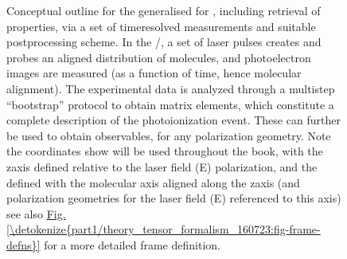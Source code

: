 \documentclass[letterpaper,table,10pt,english]{jupyterBook}
\begin{document}
\begin{figure}[htbp]
\centering
\capstart

\noindent{}
\caption{Conceptual outline for the generalised {\hyperref[\detokenize{backmatter/glossary:term-bootstrap-retrieval-protocol}]{}} for {\hyperref[\detokenize{backmatter/glossary:term-radial-matrix-elements}]{}}, including retrieval of {\hyperref[\detokenize{backmatter/glossary:term-MF}]{}} properties, via a set of time\sphinxhyphen{}resolved measurements and suitable post\sphinxhyphen{}processing scheme. In the {\hyperref[\detokenize{backmatter/glossary:term-LF}]{}}/{\hyperref[\detokenize{backmatter/glossary:term-AF}]{}}, a set of laser pulses creates and probes an aligned distribution of molecules, and photoelectron images are measured (as a function of time, hence molecular alignment). The experimental data is analyzed through a multi\sphinxhyphen{}step “bootstrap” protocol to obtain matrix elements, which constitute a complete description of the photoionization event. These can further be used to obtain {\hyperref[\detokenize{backmatter/glossary:term-MF}]{}} observables, for any polarization geometry. Note the coordinates show will be used throughout the book, with the {\hyperref[\detokenize{backmatter/glossary:term-LF}]{}} z\sphinxhyphen{}axis defined relative to the laser field (E) polarization, and the {\hyperref[\detokenize{backmatter/glossary:term-MF}]{}} defined with the molecular axis aligned along the z\sphinxhyphen{}axis (and polarization geometries for the laser field (E) referenced to this axis) \sphinxhyphen{} see also \hyperref[\detokenize{part1/theory_tensor_formalism_160723:fig-frame-defns}]{Fig.\@ \ref{\detokenize{part1/theory_tensor_formalism_160723:fig-frame-defns}}} for a more detailed frame definition.}\label{\detokenize{part1/main_intro_060723:fig-bootstrap-concept-outline}}\end{figure}
\end{document}

